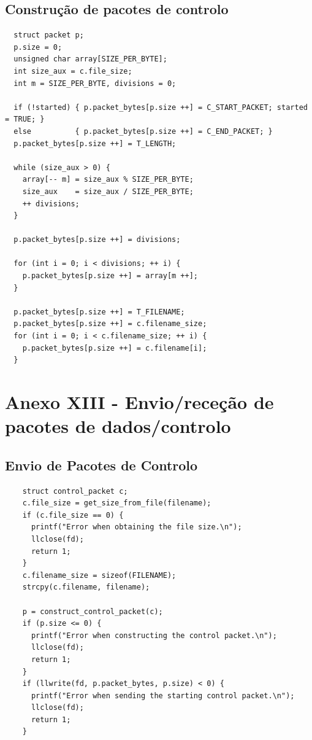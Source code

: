 \documentclass[article, a4paper, 11pt, oneside]{memoir}
\begin{document}
\subsection{Construção de pacotes de controlo}
\begin{lstlisting}
  struct packet p;
  p.size = 0;
  unsigned char array[SIZE_PER_BYTE];
  int size_aux = c.file_size;
  int m = SIZE_PER_BYTE, divisions = 0;

  if (!started) { p.packet_bytes[p.size ++] = C_START_PACKET; started = TRUE; }
  else          { p.packet_bytes[p.size ++] = C_END_PACKET; }
  p.packet_bytes[p.size ++] = T_LENGTH;

  while (size_aux > 0) {
    array[-- m] = size_aux % SIZE_PER_BYTE;
    size_aux    = size_aux / SIZE_PER_BYTE;
    ++ divisions;
  }

  p.packet_bytes[p.size ++] = divisions;

  for (int i = 0; i < divisions; ++ i) {
    p.packet_bytes[p.size ++] = array[m ++];
  }

  p.packet_bytes[p.size ++] = T_FILENAME;
  p.packet_bytes[p.size ++] = c.filename_size;
  for (int i = 0; i < c.filename_size; ++ i) {
    p.packet_bytes[p.size ++] = c.filename[i];
  }
\end{lstlisting}

\section{Anexo XIII - Envio/receção de pacotes de dados/controlo}

\subsection{Envio de Pacotes de Controlo}
\begin{lstlisting}
    struct control_packet c;
    c.file_size = get_size_from_file(filename);
    if (c.file_size == 0) {
      printf("Error when obtaining the file size.\n");
      llclose(fd);
      return 1;
    }
    c.filename_size = sizeof(FILENAME);
    strcpy(c.filename, filename);
    
    p = construct_control_packet(c);
    if (p.size <= 0) {
      printf("Error when constructing the control packet.\n");
      llclose(fd);
      return 1;
    }
    if (llwrite(fd, p.packet_bytes, p.size) < 0) {
      printf("Error when sending the starting control packet.\n");
      llclose(fd);
      return 1;
    }
\end{lstlisting}
\end{document}
